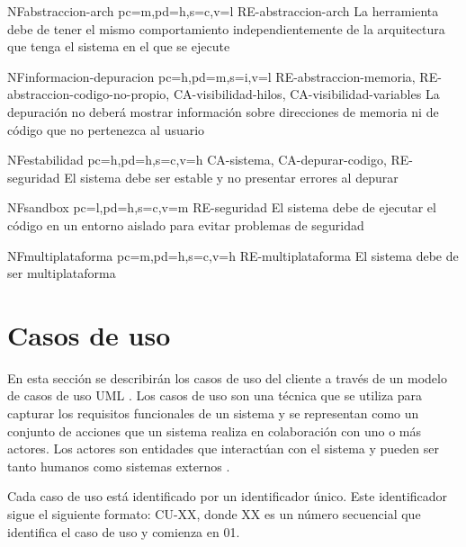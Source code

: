 \begin{softwareReq}{NF}{abstraccion-arch}
    {pc=m,pd=h,s=c,v=l}
    {RE-abstraccion-arch}
    La herramienta debe de tener el mismo comportamiento independientemente de la arquitectura que tenga el sistema en el que se ejecute
\end{softwareReq} 

\begin{softwareReq}{NF}{informacion-depuracion}
    {pc=h,pd=m,s=i,v=l}
    {RE-abstraccion-memoria, RE-abstraccion-codigo-no-propio, CA-visibilidad-hilos, CA-visibilidad-variables}
    La depuración no deberá mostrar información sobre direcciones de memoria ni de código que no pertenezca al usuario
\end{softwareReq}

\begin{softwareReq}{NF}{estabilidad}
    {pc=h,pd=h,s=c,v=h}
    {CA-sistema, CA-depurar-codigo, RE-seguridad}
    El sistema debe ser estable y no presentar errores al depurar
\end{softwareReq}

\begin{softwareReq}{NF}{sandbox}
    {pc=l,pd=h,s=c,v=m}
    {RE-seguridad}
    El sistema debe de ejecutar el código en un entorno aislado para evitar problemas de seguridad
\end{softwareReq}

\begin{softwareReq}{NF}{multiplataforma}
    {pc=m,pd=h,s=c,v=h}
    {RE-multiplataforma}
    El sistema debe de ser \gls{multiplataforma}
\end{softwareReq}

\FloatBarrier

\section{Casos de uso}\label{sec:casos-de-uso}

En esta sección se describirán los casos de uso del cliente a través de un modelo de casos de uso UML \cite{Cook2017}. Los casos de uso son una técnica que se utiliza para capturar los requisitos funcionales de un sistema y se representan como un conjunto de acciones que un sistema realiza en colaboración con uno o más actores. Los actores son entidades que interactúan con el sistema y pueden ser tanto humanos como sistemas externos \cite{UseCases-Wikipedia}.

Cada caso de uso está identificado por un identificador único. Este identificador sigue el siguiente formato: CU-XX, donde XX es un número secuencial que identifica el caso de uso y comienza en 01.

